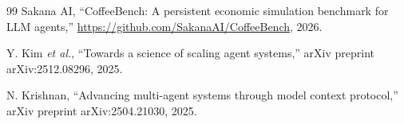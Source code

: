 \documentclass[conference]{IEEEtran}
\begin{document}
\begin{thebibliography}{99}
Sakana AI, ``CoffeeBench: A persistent economic simulation benchmark for LLM
agents,'' \url{https://github.com/SakanaAI/CoffeeBench}, 2026. %

Y. Kim \emph{et al.}, ``Towards a science of scaling agent systems,'' arXiv
preprint arXiv:2512.08296, 2025.

N. Krishnan, ``Advancing multi-agent systems through model context protocol,''
arXiv preprint arXiv:2504.21030, 2025.

\end{thebibliography}
\end{document}
